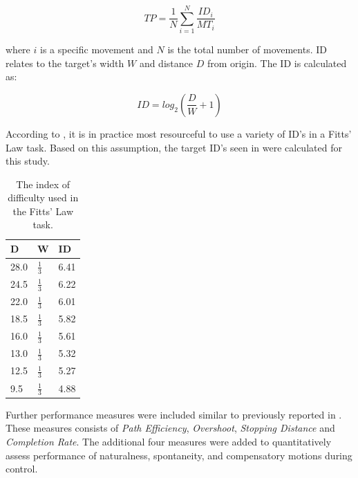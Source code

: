 \begin{equation} \label{eq:TP}
TP=\frac{1}{N}\sum_{i=1}^{N} \frac{ID_i}{MT_i} 
\end{equation}

where $i$ is a specific movement and $N$ is the total number of movements. ID relates to the target's width $W$ and distance $D$ from origin. The ID is calculated as: 

\begin{equation} \label{eq:ID}
ID=log_2(\frac{D}{W}+1)
\end{equation}

According to \cite{Scheme2013a}, it is in practice most resourceful to use a variety of ID's in a Fitts' Law task. Based on this assumption, the target ID's seen in  were calculated for this study.

\begin{table}[H]
	\centering
	\caption{The index of difficulty used in the Fitts' Law task.}
	\label{tab:P:ID}
	\begin{tabular}{l|l|l}
		
		D		 & W	         & ID				   \\ \hline
		28.0     & $\frac{1}{3}$ & 6.41                \\ \hline
		24.5     & $\frac{1}{3}$ & 6.22                \\ \hline
		22.0     & $\frac{1}{3}$ & 6.01                \\ \hline
		18.5     & $\frac{1}{3}$ & 5.82                \\ \hline
		16.0     & $\frac{1}{3}$ & 5.61                \\ \hline
		13.0     & $\frac{1}{3}$ & 5.32                \\ \hline
		12.5     & $\frac{1}{3}$ & 5.27                \\ \hline
		9.5      & $\frac{1}{3}$ & 4.88                \\ \hline
	\end{tabular}
\end{table}

Further performance measures were included similar to previously reported in \cite{Scheme2013, Scheme2013a}. These measures consists of \textit{Path Efficiency}, \textit{Overshoot}, \textit{Stopping Distance} and \textit{Completion Rate}. The additional four measures were added to quantitatively assess performance of naturalness, spontaneity, and compensatory motions during control.  